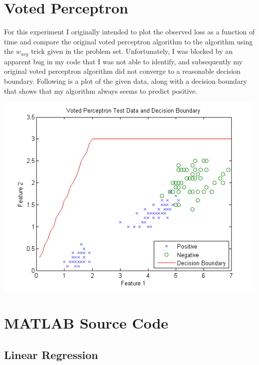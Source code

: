 \documentclass{article}
\begin{document}
\section{Voted Perceptron}
For this experiment I originally intended to plot the observed loss as a function of time and compare the original voted perceptron algorithm to the algorithm using the $w_{avg}$ trick given in the problem set. Unfortunately, I was blocked by an apparent bug in my code that I was not able to identify, and subsequently my original voted perceptron algorithm did not converge to a reasonable decision boundary. Following is a plot of the given data, along with a decision boundary that shows that my algorithm always seems to predict positive.

\includegraphics[scale=0.75]{voted_perceptron.png}

\newpage

\section{MATLAB Source Code}

\subsection{Linear Regression}
\end{document}
